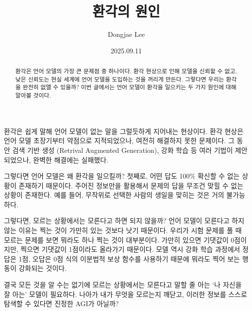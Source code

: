 \documentclass[11pt, oneside]{article}   	%
\title{환각의 원인}
\author{Dongjae Lee}
\date{2025.09.11}
\begin{document}
\maketitle


\begin{abstract}
	환각은 언어 모델의 가장 큰 문제점 중 하나이다.
	환각 현상으로 인해 모델을 신뢰할 수 없고, 낮은 신뢰도는 현실 세계에 언어 모델을 도입하는 것을 꺼리게 만든다.
	그렇다면 우리는 환각을 완전히 없앨 수 있을까?
	이번 글에서는 언어 모델이 환각을 일으키는 두 가지 원인에 대해 알아볼 것이다.
\end{abstract}
환각은 쉽게 말해 언어 모델이 없는 말을 그럴듯하게 지어내는 현상이다.
환각 현상은 언어 모델 초장기부터 약점으로 지적되었으나, 여전히 해결하지 못한 문제이다.
그 동안 검색 기반 생성 (Retrival Augmented Generation), 강화 학습 등 여러 기법이 제안되었으나, 완벽한 해결에는 실패했다.

그렇다면 언어 모델은 왜 환각을 일으킬까?
첫째로, 어떤 답도 100\% 확신할 수 없는 상황이 존재하기 때문이다.
주어진 정보만을 활용해서 문제의 답을 무조건 맞힐 수 없는 상황이 존재한다.
예를 들어, 무작위로 선택한 사람의 생일을 맞히는 것은 거의 불가능하다.

그렇다면, 모르는 상황에서는 모른다고 하면 되지 않을까?
언어 모델이 모른다고 하지 않는 이유는 찍는 것이 가만히 있는 것보다 낫기 때문이다.
우리가 시험 문제를 풀 때 모르는 문제를 보면 뭐라도 하나 찍는 것이 대부분이다.
가만히 있으면 기댓값이 0점이지만, 찍으면 기댓값이 1점이라도 올라가기 때문이다.
모델 역시 강화 학습 과정에서 정답은 1점, 오답은 0점 식의 이분법적 보상 함수를 사용하기 때문에 뭐라도 찍어 보는 행동이 강화되는 것이다.

결국 모든 것을 알 수는 없기에 모르는 상황에서는 모른다고 말할 줄 아는 `나 자신을 잘 아는' 모델이 필요하다.
나아가 내가 무엇을 모르는지 깨닫고, 이러한 정보를 스스로 탐색할 수 있다면 진정한 AGI가 아닐까?
\end{document}
